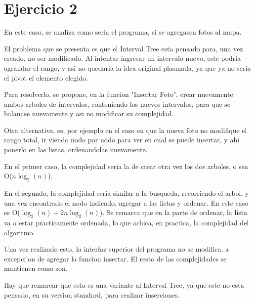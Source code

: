 \newpage
\section{Ejercicio 2}

En este caso, se analiza como seria el programa, si se agregasen fotos al mapa.

El problema que se presenta es que el Interval Tree esta pensado para, una vez creado, no ser modificado. Al intentar ingresar un intervalo nuevo, este podria agrandar el rango, y asi no quedaria la idea original plasmada, ya que ya no seria el pivot el elemento elegido.



Para resolverlo, se propone, en la funcion "Insertar Foto", crear nuevamente ambos arboles de intervalos, conteniendo los nuevos intervalos, para que se balancee nuevamente y asi no modificar su complejidad.

Otra alternativa, es, por ejemplo en el caso en que la nueva foto no modifique el rango total, ir viendo nodo por nodo para ver en cual se puede insertar, y ahi ponerlo en las listas, ordenandolas nuevamente.



En el primer caso, la complejidad seria la de crear otra vez los dos arboles, o sea O($n\log_2(n)$).

En el segundo, la complejidad seria similar a la busqueda, recorriendo el arbol, y una vez encontrado el nodo indicado, agregar a las listas y ordenar. En este caso es O($\log_2(n) + 2n\log_2(n)$). Se remarca que en la parte de ordenar, la lista va a estar practicamente ordenada, lo que achica, en practica, la complejidad del algoritmo.


Una vez realizado esto, la interfaz superior del programa no se modifica, a excepci'on de agregar la funcion insertar. El resto de las complejidades se mantienen como son.

Hay que remarcar que esta es una variante al Interval Tree, ya que este no esta pensado, en su version standard, para realizar inserciones.

